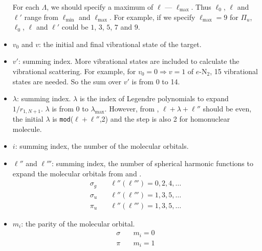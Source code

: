\documentclass[aps,pra,groupedaddress,12pt,
               amsfonts,amssymb,
               preprint
    ]{revtex4}
\begin{document}
\begin{itemize}
  For each $\Lambda$, we should specify a maximum of $\ell$ ---
  $\ell_{\max}$. Thus $\ell_0$, $\ell$ and $\ell'$ range from
  $\ell_{\min}$ and $\ell_{\max}$. For example, if we specify
  $\ell_{\max} = 9$ for $\Pi_u$, $\ell_0$, $\ell$ and $\ell'$ could be
  $1$, $3$, $5$, $7$ and $9$.
\item $v_0$ and $v$: the initial and final vibrational state of the target.
\item $v'$: summing index. More vibrational states are included to
  calculate the vibrational scattering. For example, for $v_0 = 0
  \Rightarrow v = 1$ of $e$-N$_2$, 15 vibrational states are needed. So
  the sum over $v'$ is from 0 to 14.
\item $\lambda$: summing index. $\lambda$ is the index of Legendre
  polynomials to expand $1/r_{1,N+1}$. $\lambda$ is from 0 to
  $\lambda_{\max}$. However, from , $\ell+\lambda+\ell''$ should be even, the initial $\lambda$ is \texttt{mod}($\ell+\ell''$,2) and the step is also 2 for homonuclear molecule.
\item $i$: summing index, the number of the molecular orbitals.
\item $\ell''$ and $\ell'''$: summing index, the number of spherical
  harmonic functions to expand the molecular orbitals from 
  and .  
  \begin{subequations}
    \begin{align}
      \label{eq:lambda}
      \sigma_g \quad &  \ell''(\ell''') = 0, 2, 4, \ldots \\
      \sigma_u \quad &  \ell''(\ell''') = 1, 3, 5, \ldots \\
      \pi_u    \quad &  \ell''(\ell''') = 1, 3, 5, \ldots
    \end{align}
  \end{subequations}
\item $m_i$: the parity of the molecular orbital.
  \begin{subequations}
    \begin{align}
      \label{eq:moparity}
      \sigma \quad &  m_i = 0 \\
      \pi    \quad &  m_i = 1
    \end{align}
  \end{subequations}
\end{itemize}

\end{document}

